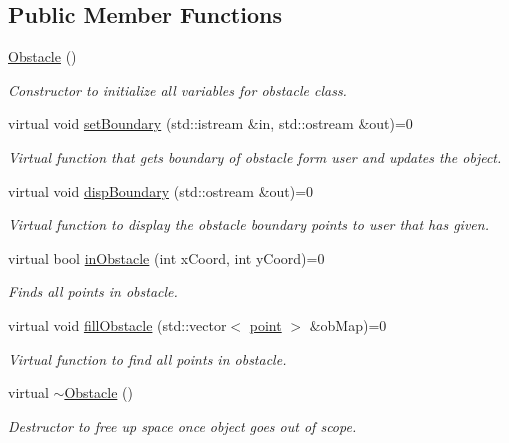 \subsection*{Public Member Functions}
\begin{DoxyCompactItemize}
\item 
\hyperlink{classObstacle_a8f734072321fa06a7b7dae2d5f50f352}{Obstacle} ()
\begin{DoxyCompactList}\small\item\em Constructor to initialize all variables for obstacle class. \end{DoxyCompactList}\item 
virtual void \hyperlink{classObstacle_a8915ad90dc24f48df3ff0c38e8c695aa}{set\+Boundary} (std\+::istream \&in, std\+::ostream \&out)=0
\begin{DoxyCompactList}\small\item\em Virtual function that gets boundary of obstacle form user and updates the object. \end{DoxyCompactList}\item 
virtual void \hyperlink{classObstacle_aba2625490b7d32632d585198038d279a}{disp\+Boundary} (std\+::ostream \&out)=0
\begin{DoxyCompactList}\small\item\em Virtual function to display the obstacle boundary points to user that has given. \end{DoxyCompactList}\item 
virtual bool \hyperlink{classObstacle_a52c373a98616f6c41058f725b73479f5}{in\+Obstacle} (int x\+Coord, int y\+Coord)=0
\begin{DoxyCompactList}\small\item\em Finds all points in obstacle. \end{DoxyCompactList}\item 
virtual void \hyperlink{classObstacle_ade69ded6cb0d58ff914e64aaef4a0464}{fill\+Obstacle} (std\+::vector$<$ \hyperlink{structpoint}{point} $>$ \&ob\+Map)=0
\begin{DoxyCompactList}\small\item\em Virtual function to find all points in obstacle. \end{DoxyCompactList}\item 
virtual \hyperlink{classObstacle_af2f9cc9c6cff75dca0974fd5ac4f71a9}{$\sim$\+Obstacle} ()
\begin{DoxyCompactList}\small\item\em Destructor to free up space once object goes out of scope. \end{DoxyCompactList}\end{DoxyCompactItemize}


